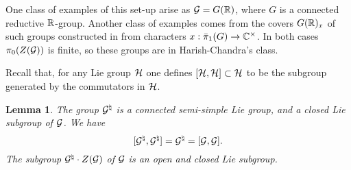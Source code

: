 \documentclass{article}
\newtheorem{lem}[thm]{Lemma}
\theoremstyle{definition}
\numberwithin{equation}{section}
\renewcommand{\-}{\hyp{}}
\begin{document}
One class of examples of this set-up arise as $\mathcal{G}=G(\mathbb{R})$, where $G$ is a connected reductive $\mathbb{R}$-group. Another class of examples comes from the covers $G(\mathbb{R})_x$ of such groups constructed in \cite{KalHDC} from characters $x : \bar\pi_1(G) \to \mathbb{C}^\times$. In both cases $\pi_0(Z(\mathcal{G}))$ is finite, so these groups are in  Harish-Chandra's class.

Recall that, for any Lie group $\mathcal{H}$ one defines $[\mathcal{H},\mathcal{H}] \subset \mathcal{H}$ to be the subgroup generated by the commutators in $\mathcal{H}$.

\begin{lem} \label{lem:comm}
	The group $\mathcal{G}^\natural$ is a connected semi-simple Lie group, and a closed Lie subgroup of $\mathcal{G}$. We have
	\[ [\mathcal{G}^\natural,\mathcal{G}^\natural] = \mathcal{G}^\natural = [\mathcal{G},\mathcal{G}]. \]
	The subgroup $\mathcal{G}^\natural \cdot Z(\mathcal{G})$ of $\mathcal{G}$ is an open and closed Lie subgroup.
\end{lem}
\end{document}
